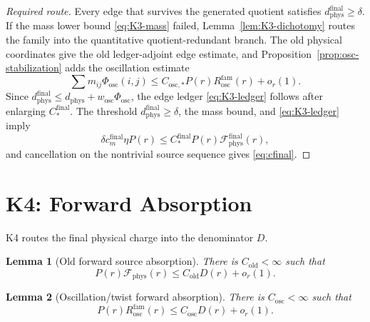 \documentclass[11pt]{article}
\newtheorem{lemma}{Lemma}
\begin{document}
\begin{proof}[Required route]
Every edge that survives the generated quotient satisfies
\(d_{\mathrm{phys}}^{\mathrm{final}}\ge\delta\).  If the mass lower bound
\eqref{eq:K3-mass} failed, Lemma~\ref{lem:K3-dichotomy} routes the family into
the quantitative quotient-redundant branch.  The old physical coordinates give
the old ledger-adjoint edge estimate, and
Proposition~\ref{prop:osc-stabilization} adds the oscillation estimate
\[
\sum m_{ij}\Phi_{\mathrm{osc}}(i,j)
\le C_{\mathrm{osc},*}P(r)R_{\mathrm{osc}}^{\mathrm{fam}}(r)+o_r(1).
\]
Since \(d_{\mathrm{phys}}^{\mathrm{final}}\le
d_{\mathrm{phys}}+w_{\mathrm{osc}}\Phi_{\mathrm{osc}}\), the edge ledger
\eqref{eq:K3-ledger} follows after enlarging \(C_*^{\mathrm{final}}\).  The
threshold \(d_{\mathrm{phys}}^{\mathrm{final}}\ge\delta\), the mass bound, and
\eqref{eq:K3-ledger} imply
\[
\delta c_m^{\mathrm{final}}\eta P(r)
\le C_*^{\mathrm{final}}P(r)\mathcal F_{\mathrm{phys}}^{\mathrm{final}}(r),
\]
and cancellation on the nontrivial source sequence gives \eqref{eq:cfinal}.
\end{proof}

\clearpage
\section{K4: Forward Absorption}
\label{sec:K4}

K4 routes the final physical charge into the denominator \(D\).

\begin{lemma}[Old forward source absorption]
\label{lem:K4-old}
There is \(C_{\mathrm{old}}<\infty\) such that
\begin{equation}
\label{eq:K4-old}
P(r)\mathcal F_{\mathrm{phys}}(r)
\le C_{\mathrm{old}}D(r)+o_r(1).
\end{equation}
\end{lemma}

\begin{lemma}[Oscillation/twist forward absorption]
\label{lem:K4-osc}
There is \(C_{\mathrm{osc}}<\infty\) such that
\begin{equation}
\label{eq:K4-osc}
P(r)R_{\mathrm{osc}}^{\mathrm{fam}}(r)
\le C_{\mathrm{osc}}D(r)+o_r(1).
\end{equation}
\end{lemma}
\end{document}
